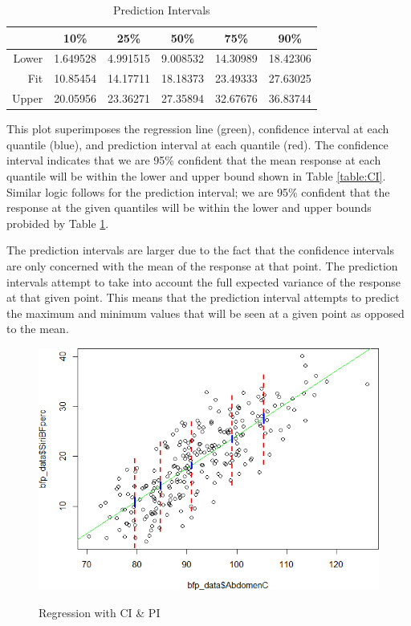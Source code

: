 \documentclass[a4paper, 11pt]{article}
\begin{document}
\begin{table}[H]
	\centering
	\begin{tabular}{r | c | c | c | c | c}
	   & 10\% & 25\% & 50\% & 75\% & 90\% \\ \hline
	 Lower & 1.649528 & 4.991515 & 9.008532 & 14.30989 & 18.42306 \\
	 Fit &10.85454 & 14.17711 &  18.18373 &  23.49333 &  27.63025 \\
	 Upper & 20.05956 & 23.36271 & 27.35894 & 32.67676 & 36.83744 
	\end{tabular}
	\caption{Prediction Intervals}
	\label{table:PI}
\end{table}

This plot superimposes the regression line (green), confidence interval at each quantile (blue), and prediction interval at each quantile (red). The confidence interval indicates that we are 95\% confident that the mean response at each quantile will be within the lower and upper bound shown in Table \ref{table:CI}. Similar logic follows for the prediction interval; we are 95\% confident that the response at the given quantiles will be within the lower and upper bounds probided by Table \ref{table:PI}.

The prediction intervals are larger due to the fact that the confidence intervals are only concerned with the mean of the response at that point. The prediction intervals attempt to take into account the full expected variance of the response at that given point. This means that the prediction interval attempts to predict the maximum and minimum values that will be seen at a given point as opposed to the mean.

\begin{figure}[H]
	\centering
	\caption{Regression with CI \& PI}
	\includegraphics[width=\textwidth]{plot_with_intervals.png}
	\label{figure:ci_pi}
\end{figure}
\end{document}
